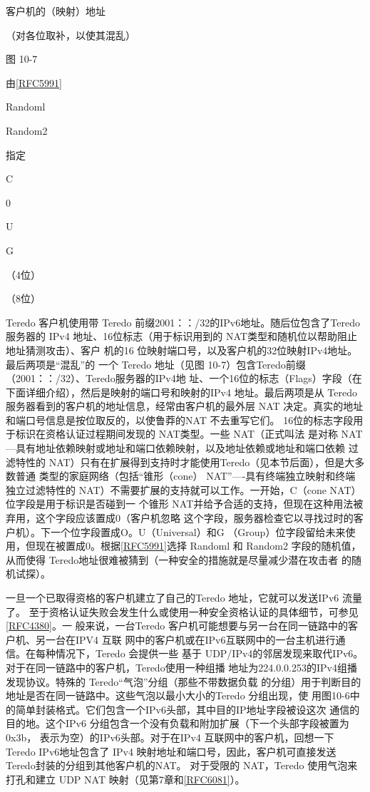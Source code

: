 客户机的（映射）地址

（对各位取补，以使其混乱）

图 10-7

由\href{https://www.rfc-editor.org/rfc/rfc5991}{[RFC5991]}

Randoml

Random2

指定

C

0

U

G

（4位）

（8位）

Teredo 客户机使用带 Teredo 前缀2001：：/32的IPv6地址。随后位包含了Teredo服务器的
IPv4 地址、16位标志（用于标识用到的 NAT类型和随机位以帮助阻止地址猜测攻击）、客户
机的16 位映射端口号，以及客户机的32位映射IPv4地址。最后两项是“混乱”的
一个 Teredo 地址（见图 10-7）包含Teredo前缀（2001：：/32）、Teredo服务器的IPv4地
址、一个16位的标志（Flags）字段（在下面详细介绍），然后是映射的端口号和映射的IPv4
地址。最后两项是从 Teredo服务器看到的客户机的地址信息，经常由客户机的最外层 NAT
决定。真实的地址和端口号信息是按位取反的，以使鲁莽的NAT 不去重写它们。
16位的标志字段用于标识在资格认证过程期间发现的 NAT类型。一些 NAT（正式叫法
是对称 NAT—具有地址依赖映射或地址和端口依赖映射，以及地址依赖或地址和端口依赖
过滤特性的 NAT）只有在扩展得到支持时才能使用Teredo（见本节后面），但是大多数普通
类型的家庭网络（包括“锥形（cone） NAT”—-具有终端独立映射和终端独立过滤特性的
NAT）不需要扩展的支持就可以工作。一开始，C（cone NAT）位字段是用于标识是否碰到一
个锥形 NAT并给予合适的支持，但现在这种用法被弃用，这个字段应该置成0（客户机忽略
这个字段，服务器检查它以寻找过时的客户机）。下一个位字段置成O。U（Universal）和G
（Group）位字段留给未来使用，但现在被置成0。根据\href{https://www.rfc-editor.org/rfc/rfc5991}{[RFC5991]}选择 Randoml 和 Random2
字段的随机值，从而使得 Teredo地址很难被猜到（一种安全的措施就是尽量减少潜在攻击者
的随机试探）。

一旦一个已取得资格的客户机建立了自己的Teredo 地址，它就可以发送IPv6 流量了。
至于资格认证失败会发生什么或使用一种安全资格认证的具体细节，可参见\href{https://www.rfc-editor.org/rfc/rfc4380}{[RFC4380]}。一
般来说，一台Teredo 客户机可能想要与另一台在同一链路中的客户机、另一台在IPV4 互联
网中的客户机或在IPv6互联网中的一台主机进行通信。在每种情况下，Teredo 会提供一些
基于 UDP/IPv4的邻居发现来取代IPv6。对于在同一链路中的客户机，Teredo使用一种组播
地址为224.0.0.253的IPv4组播发现协议。特殊的 Teredo“气泡”分组（那些不带数据负载
的分组）用于判断目的地址是否在同一链路中。这些气泡以最小大小的Teredo 分组出现，使
用图10-6中的简单封装格式。它们包含一个IPv6头部，其中目的IP地址字段被设这次
通信的目的地。这个IPv6 分组包含一个没有负载和附加扩展（下一个头部字段被置为0x3b，
表示为空）的IPv6头部。对于在IPv4 互联网中的客户机，回想一下 Teredo IPv6地址包含了
IPv4 映射地址和端口号，因此，客户机可直接发送Teredo封装的分组到其他客户机的NAT。
对于受限的 NAT，Teredo 使用气泡来打孔和建立 UDP NAT 映射（见第7章和\href{https://www.rfc-editor.org/rfc/rfc6081}{[RFC6081]}）。

